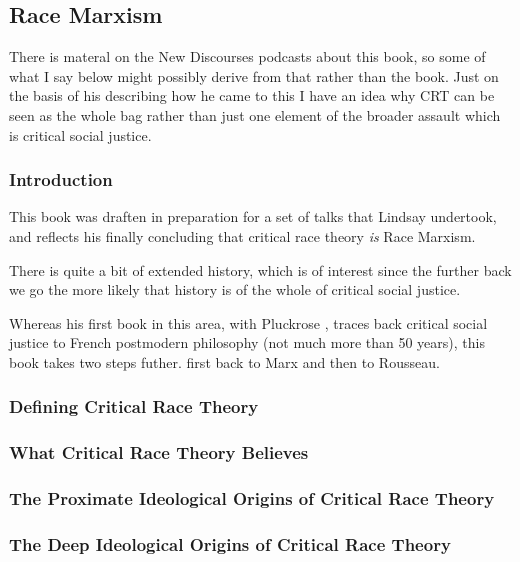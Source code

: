 \documentclass[10pt,titlepage]{book}
\begin{document}
\subsection{Race Marxism \cite{lindsay-racemarx}}

There is materal on the New Discourses podcasts \cite{lindsay-discourses} about this book, so some of what I say below might possibly derive from that rather than the book.
Just on the basis of his describing how he came to this I have an idea why CRT can be seen as the whole bag rather than just one element of the broader assault which is critical social justice.

\subsubsection{Introduction}

This book was draften in preparation for a set of talks that Lindsay undertook, and reflects his finally concluding that critical race theory \emph{is} Race Marxism.

There is quite a bit of extended history, which is of interest since the further back we go the more likely that history is of the whole of critical social justice.

Whereas his first book in this area, with Pluckrose \cite{pluckrose-cynical}, traces back critical social justice to French postmodern philosophy (not much more than 50 years), this book takes two steps futher. first back to Marx and then to Rousseau.

\subsubsection{Defining Critical Race Theory}

\subsubsection{What Critical Race Theory Believes}

\subsubsection{The Proximate Ideological Origins of Critical Race Theory}

\subsubsection{The Deep Ideological Origins of Critical Race Theory}
\end{document}
